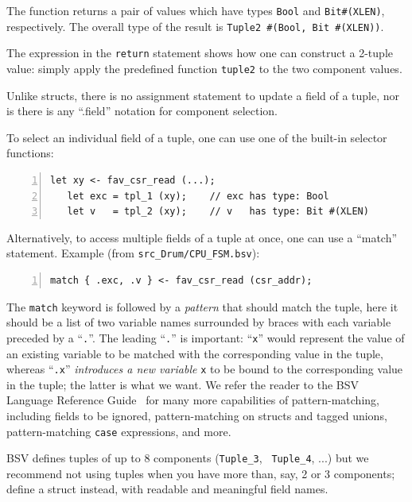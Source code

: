 The function returns a pair of values which have types \verb|Bool| and
\verb|Bit#(XLEN)|, respectively.  The overall type of the result is
\verb|Tuple2 #(Bool, Bit #(XLEN))|.

The expression in the \verb|return| statement shows how one can
construct a 2-tuple value: simply apply the predefined function
\verb|tuple2| to the two component values.

Unlike structs, there is no assignment statement to update a field of
a tuple, nor is there is any ``.field'' notation for component
selection.

To select an individual field of a tuple, one can use one of the
built-in selector functions:

{\small
\begin{Verbatim}[frame=single, numbers=left]
   let xy <- fav_csr_read (...);
   let exc = tpl_1 (xy);    // exc has type: Bool
   let v   = tpl_2 (xy);    // v   has type: Bit #(XLEN)
\end{Verbatim}
}

Alternatively, to access multiple fields of a tuple at once, one can
use a ``match'' statement. Example (from \verb|src_Drum/CPU_FSM.bsv|):


{\small
\begin{Verbatim}[frame=single, numbers=left]
   match { .exc, .v } <- fav_csr_read (csr_addr);
\end{Verbatim}
}

The \verb|match| keyword is followed by a \emph{pattern} that should
match the tuple, {\ie} here it should be a list of two variable names
surrounded by braces with each variable preceded by a ``\verb|.|''.
The leading ``\verb|.|'' is important: ``\verb|x|'' would represent
the value of an existing variable to be matched with the corresponding
value in the tuple, whereas ``\verb|.x|'' \emph{introduces a new
variable} \verb|x| to be bound to the corresponding value in the
tuple; the latter is what we want.  We refer the reader to the BSV
Language Reference Guide~\cite{BSV_Lang_Ref_Guide} for many more
capabilities of pattern-matching, including fields to be ignored,
pattern-matching on structs and tagged unions, pattern-matching
\verb|case| expressions, and more.

BSV defines tuples of up to 8 components ({\tt Tuple\_3}, {\tt
Tuple\_4}, ...) but we recommend not using tuples when you have more
than, say, 2 or 3 components; define a struct instead, with readable
and meaningful field names.

